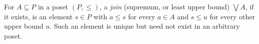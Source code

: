 
For $A\subseteq P$ in a poset $(P,\le)$, a \emph{join} (supremum, or least upper bound) $\bigvee A$, if it exists, is an element $s\in P$ with $a\le s$ for every $a\in A$ and $s\le u$ for every other upper bound $u$. Such an element is unique but need not exist in an arbitrary poset.
